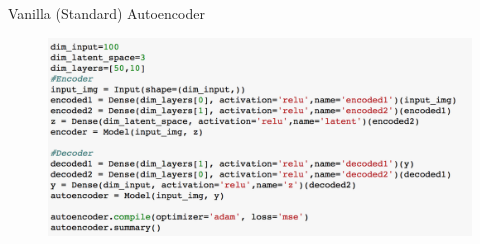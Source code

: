 \documentclass[xcolor=pdftex,dvipsnames,table,mathserif]{beamer}
\begin{document}
\begin{frame}{Vanilla (Standard) Autoencoder}
\begin{figure}
\includegraphics[width=\columnwidth]{../graphics/StandardAutoencoder}
\end{figure}
\end{frame}

\end{document}

